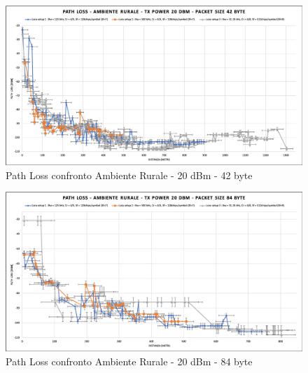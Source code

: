 \documentclass[12pt,a4paper,openright,twoside]{report}
\begin{document}
\begin{figure}[h]                      
\begin{center} 
\includegraphics[width=\textwidth]{PATH_LOSS_confronto_AR_20dBm_42byte.png}
\caption[Path Loss confronto Ambiente Rurale - 20 dBm - 42 byte]{Path Loss confronto Ambiente Rurale - 20 dBm - 42 byte}\label{fig:prima}
\end{center}
\end{figure}

\begin{figure}[h]                      
\begin{center} 
\includegraphics[width=\textwidth]{PATH_LOSS_confronto_AR_20dBm_84byte.png}
\caption[Path Loss confronto Ambiente Rurale - 20 dBm - 84 byte]{Path Loss confronto Ambiente Rurale - 20 dBm - 84 byte}\label{fig:prima}
\end{center}
\end{figure}
\end{document}
